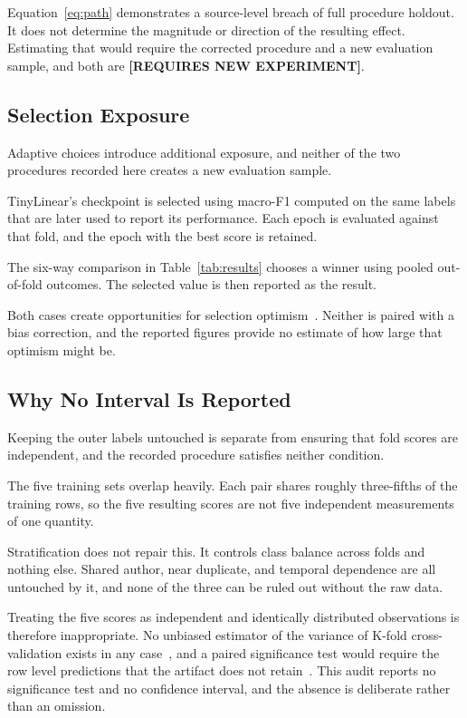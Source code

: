 \documentclass[runningheads]{llncs}
\newcommand{\needexp}{\textbf{[REQUIRES NEW EXPERIMENT]}}
\begin{document}
Equation~\ref{eq:path} demonstrates a source-level breach of full procedure holdout. It does not determine the magnitude or direction of the resulting effect. Estimating that would require the corrected procedure and a new evaluation sample, and both are \needexp{}.

\subsection{Selection Exposure}

Adaptive choices introduce additional exposure, and neither of the two procedures recorded here creates a new evaluation sample.

TinyLinear’s checkpoint is selected using macro-F1 computed on the same labels that are later used to report its performance. Each epoch is evaluated against that fold, and the epoch with the best score is retained.

The six-way comparison in Table~\ref{tab:results} chooses a winner using pooled out-of-fold outcomes. The selected value is then reported as the result.

Both cases create opportunities for selection optimism~\cite{cawley2010overfitting,varma2006bias}. Neither is paired with a bias correction, and the reported figures provide no estimate of how large that optimism might be.

\subsection{Why No Interval Is Reported}

Keeping the outer labels untouched is separate from ensuring that fold scores are independent, and the recorded procedure satisfies neither condition.

The five training sets overlap heavily. Each pair shares roughly three-fifths of the training rows, so the five resulting scores are not five independent measurements of one quantity.

Stratification does not repair this. It controls class balance across folds and nothing else. Shared author, near duplicate, and temporal dependence are all untouched by it, and none of the three can be ruled out without the raw data.

Treating the five scores as independent and identically distributed observations is therefore inappropriate. No unbiased estimator of the variance of K-fold cross-validation exists in any case~\cite{bengio2004variance}, and a paired significance test would require the row level predictions that the artifact does not retain~\cite{dror2018hitchhiker}. This audit reports no significance test and no confidence interval, and the absence is deliberate rather than an omission.
\end{document}

